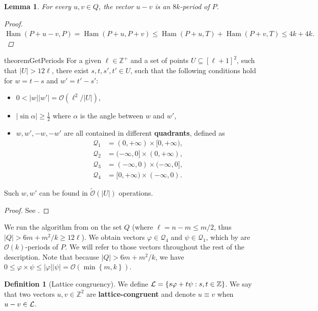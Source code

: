 \documentclass[11pt]{article}
\newcommand{\Z}{\mathbb{Z}}
\renewcommand{\O}{\mathcal{O}}
\newcommand{\tO}{\tilde{\mathcal{O}}}
\renewcommand{\phi}{\varphi}
\newcommand{\set}[1]{\left\lbrace #1 \right\rbrace}
\newcommand{\eq}[1]{\begin{align*} #1 \end{align*}}
\theoremstyle{plain}
\newtheorem{lemma}{Lemma}
\theoremstyle{definition}
\newtheorem{definition}{Definition}
\theoremstyle{remark}
\DeclareMathOperator*{\Ham}{Ham}
\begin{document}
\begin{lemma} \label{periodicity_lemma}
	For every $u, v \in Q$, the vector $u - v$ is an $8k$-period of $P$.
	\begin{proof}
		$\Ham(P + u - v, P) = \Ham(P + u, P + v) \le \Ham(P + u, T) + \Ham(P + v, T) \le 4k + 4k. $
	\end{proof}
\end{lemma}


\newcommand{\Q}{\mathcal{Q}}
\begin{restatable*}{theorem}{GetPeriods}\label{get_periods}
	For a given $\ell \in \Z^+$ and a set of points $U \subseteq [\ell + 1]^2$, such that $|U| > 12\ell$, there exist $s, t, s', t' \in U$, such that the following conditions hold for $w = t - s$ and $w' = t' - s'$:
	\begin{itemize}
		\item $0 < |w||w'| = \O(\ell^2 / |U|)$,
		\item $|\sin \alpha| \ge \frac{1}{2}$ where $\alpha$ is the angle between $w$ and $w'$,
		\item $w, w', -w, -w'$ are all contained in different \textbf{quadrants}, defined as
			\eq{
				\Q_1 &= (0, +\infty) \times [0, +\infty), \\
				\Q_2 &= (-\infty, 0] \times (0, +\infty), \\
				\Q_3 &= (-\infty, 0) \times (-\infty, 0], \\
				\Q_4 &= [0, +\infty) \times (-\infty, 0).
			}
	\end{itemize}
	Such $w, w'$ can be found in $\tO(|U|)$ operations.
\end{restatable*}
\begin{proof} See . \end{proof}

We run the algorithm from  on the set $Q$ (where $\ell = n - m \le m / 2$, thus $|Q| > 6m + m^2/k \ge 12\ell$).
We obtain vectors $\phi \in \Q_4$ and $\psi \in \Q_1$, which by  are $\O(k)$-periods of $P$.
We will refer to those vectors throughout the rest of the description.
Note that because $|Q| > 6m + m^2 / k$, we have $0 \le \phi \times \psi \le |\phi||\psi| = \O(\min\set{m, k})$.


\begin{definition}[Lattice congruency]\label{lattice_congruency}
	We define $\L = \set{s\phi + t\psi : s, t \in \Z}$.
	We say that two vectors $u, v \in \Z^2$ are \textbf{lattice-congruent} and denote $u \equiv v$ when $u - v \in \mathcal{L}$.
\end{definition}
\end{document}
